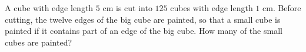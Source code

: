 A cube with edge length $5$ cm is cut into $125$ cubes with edge length $1$ cm. Before cutting, the twelve edges of the big cube are painted, so that a small cube is painted if it contains part of an edge of the big cube. How many of the small cubes are painted?
